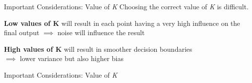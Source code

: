 \documentclass[usenames,dvipsnames]{beamer}
\begin{document}
\begin{frame}{Important Considerations: Value of \emph{K}}
Choosing the correct value of \emph{K} is difficult.
\pause

\textbf{Low values of K} will result in each point having a very high influence on the final output $\implies$ noise will influence the result
\pause

\textbf{High values of K} will result in smoother decision boundaries \\$\implies$ lower variance but also higher bias
\end{frame}

\begin{frame}{Important Considerations: Value of \emph{K}}

\end{frame}
\end{document}
